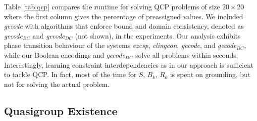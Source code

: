 \documentclass{tlp}
\newcommand{\systemname}[1]{\emph{#1}}
\begin{document}
Table \ref{tab:qcp} compares the runtime for solving QCP problems of size $20 \times 20$ where the first column gives the percentage of preassigned values. We included \systemname{gecode} with algorithms that enforce bound and domain consistency, denoted as \systemname{gecode}$_{BC}$ and \systemname{gecode}$_{DC}$ (not shown), in the experiments. Our analysis exhibits phase transition behaviour of the systems \systemname{ezcsp}, \systemname{clingcon}, \systemname{gecode}, and \systemname{gecode}$_{BC}$, while our Boolean encodings and \systemname{gecode}$_{DC}$ solve all problems within seconds. Interestingly, learning constraint interdependencies as in our approach is sufficient to tackle QCP. In fact, most of the time for $S$, $B_k$, $R_k$ is spent on grounding, but not for solving the actual problem.


\subsection{Quasigroup Existence}
\end{document}
